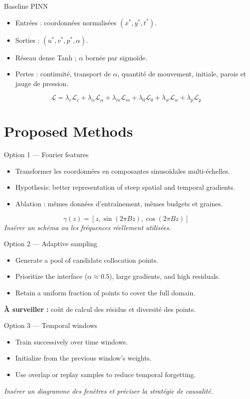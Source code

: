 \documentclass[aspectratio=169,11pt]{beamer}
\begin{document}
\begin{frame}{Baseline PINN}
\begin{itemize}
  \item Entrées : coordonnées normalisées $(x^*,y^*,t^*)$.
  \item Sorties : $(u^*,v^*,p^*,\alpha)$.
  \item Réseau dense Tanh ; $\alpha$ bornée par sigmoïde.
  \item Pertes : continuité, transport de $\alpha$, quantité de mouvement, initiale, parois et jauge de pression.
\end{itemize}
\[
\mathcal L=\lambda_c\mathcal L_c+\lambda_\alpha\mathcal L_\alpha+
\lambda_m\mathcal L_m+\lambda_0\mathcal L_0+\lambda_w\mathcal L_w+\lambda_p\mathcal L_p
\]
\end{frame}

\section{Proposed Methods}
\begin{frame}{Option 1 — Fourier features}
\begin{itemize}
  \item Transformer les coordonnées en composantes sinusoïdales multi-échelles.
  \item Hypothesis: better representation of steep spatial and temporal gradients.
  \item Ablation : mêmes données d'entraînement, mêmes budgets et graines.
\end{itemize}
\[
\gamma(z)=[z,\sin(2\pi Bz),\cos(2\pi Bz)]
\]
\textit{Insérer un schéma ou les fréquences réellement utilisées.}
\end{frame}

\begin{frame}{Option 2 — Adaptive sampling}
\begin{itemize}
  \item Generate a pool of candidate collocation points.
  \item Prioritize the interface ($\alpha\approx0.5$), large gradients, and high residuals.
  \item Retain a uniform fraction of points to cover the full domain.
\end{itemize}
\textbf{À surveiller :} coût de calcul des résidus et diversité des points.
\end{frame}

\begin{frame}{Option 3 — Temporal windows}
\begin{itemize}
  \item Train successively over time windows.
  \item Initialize from the previous window's weights.
  \item Use overlap or replay samples to reduce temporal forgetting.
\end{itemize}
\textit{Insérer un diagramme des fenêtres et préciser la stratégie de causalité.}
\end{frame}
\end{document}
